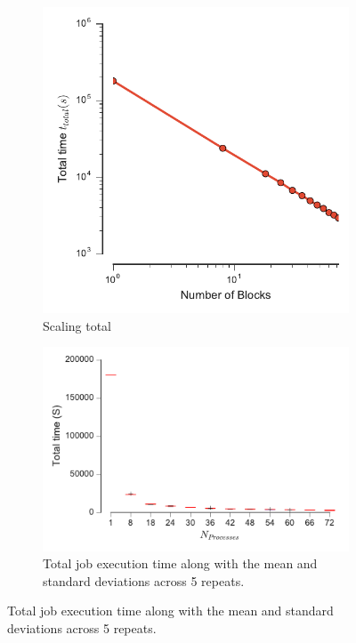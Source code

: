 \begin{figure}[tbp]
\centering
\begin{subfigure}{.35\textwidth}
  \centering
  \includegraphics[width=\linewidth]{figs/t_total-dihedral-comm.pdf}
  \caption{Scaling total}
\end{subfigure}
\hfill
\begin{subfigure}{.5\textwidth}
  \centering
  \includegraphics[width=\linewidth]{figs/total_time_boxplot-dihedral-comm.pdf}
  \caption{Total job execution time along with the mean and standard
    deviations across 5 repeats.}
\end{subfigure}
\bigskip


\end{figure}
